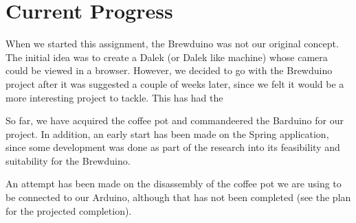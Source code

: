 \documentclass[12pt, a4paper]{article}
\begin{document}

\section{Current Progress}
When we started this assignment, the Brewduino was not our original concept. The
initial idea was to create a Dalek (or Dalek like machine) whose camera could be
viewed in a browser. However, we decided to go with the Brewduino project after
it was suggested a couple of weeks later, since we felt it would be a more
interesting project to tackle. This has had the

So far, we have acquired the coffee pot and commandeered the Barduino for our
project. In addition, an early start has been made on the Spring application,
since some development was done as part of the research into its feasibility and
suitability for the Brewduino.

An attempt has been made on the disassembly of the coffee pot we are using to be
connected to our Arduino, although that has not been completed (see the plan for
the projected completion).


\newpage


 
\end{document}
